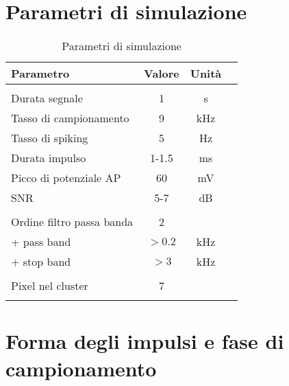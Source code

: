 \section{Parametri di simulazione}
\label{sez:parametri}



\begin{table}
\begin{center}
\begin{tabular}{l|c|c|c}
{\bf Parametro}             & Valore                & Unità \\ \hline

 & &     \\
Durata segnale             & 1      & s    \\
Tasso di campionamento     & 9      & kHz  \\
Tasso di spiking           & 5      & Hz   \\
Durata impulso             & 1-1.5  & ms   \\
Picco di potenziale AP     & 60     & mV   \\
SNR                        & 5-7    & dB   \\
                           &        &      \\
Ordine filtro passa banda  & 2      &      \\
 + pass band               & $>0.2$ & kHz  \\
 + stop band               & $>3$   & kHz  \\
                           &        &      \\
Pixel nel cluster          &    7   &      \\
 & &     \\
 
\hline
\end{tabular}
\caption[Parametri di simulazione]
{Parametri di simulazione}
\label{tab:paraemtri}
\end{center}
\end{table}







\section{Forma degli impulsi e fase di campionamento}

